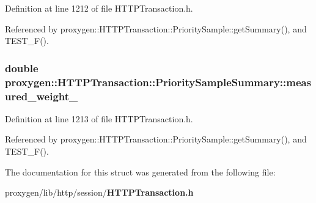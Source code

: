 Definition at line 1212 of file H\+T\+T\+P\+Transaction.\+h.



Referenced by proxygen\+::\+H\+T\+T\+P\+Transaction\+::\+Priority\+Sample\+::get\+Summary(), and T\+E\+S\+T\+\_\+\+F().

\subsubsection[{measured\+\_\+weight\+\_\+}]{\setlength{\rightskip}{0pt plus 5cm}double proxygen\+::\+H\+T\+T\+P\+Transaction\+::\+Priority\+Sample\+Summary\+::measured\+\_\+weight\+\_\+}\label{structproxygen_1_1HTTPTransaction_1_1PrioritySampleSummary_abca443e784296d54ad69b95a4f0f9e11}


Definition at line 1213 of file H\+T\+T\+P\+Transaction.\+h.



Referenced by proxygen\+::\+H\+T\+T\+P\+Transaction\+::\+Priority\+Sample\+::get\+Summary(), and T\+E\+S\+T\+\_\+\+F().



The documentation for this struct was generated from the following file\+:\begin{DoxyCompactItemize}
\item 
proxygen/lib/http/session/{\bf H\+T\+T\+P\+Transaction.\+h}\end{DoxyCompactItemize}
